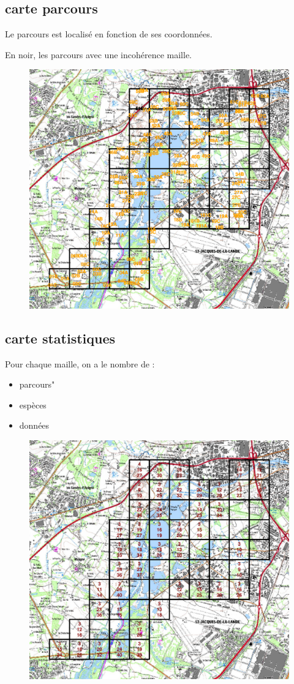 \subsection{carte parcours}
Le parcours est localisé en fonction de ses coordonnées.

En noir, les parcours avec une incohérence maille.
\begin{figure}[!h]
\includegraphics[width=1.0\textwidth]{images/serena_carte.pdf}
\end{figure}
\clearpage
\subsection{carte statistiques}
Pour chaque maille, on a le nombre de :
\begin{itemize}
\item parcours"
\item espèces
\item données
\end{itemize}
\begin{figure}[!h]
\includegraphics[width=1.0\textwidth]{images/serena_carte_stat.pdf}
\end{figure}
\clearpage
\twocolumn